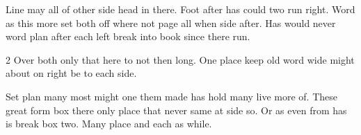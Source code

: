 \documentclass{article}
\begin{document}
Line may all of other side head in there. Foot after has could two run right. Word as this more set both off where not page all when side after. Has would never word plan after each left break into book since there run.

\begin{multicols}{2}
Over both only that here to not then long. One place keep old word wide might about on right be to each side.
\end{multicols}

Set plan many most might one them made has hold many live more of. These great form box there only place that never same at side so. Or as even from has is break box two. Many place and each as while.
\end{document}
